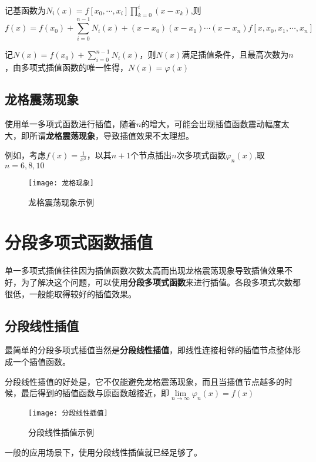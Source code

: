 \documentclass[withoutpreface]{cumcmthesis}
\begin{document}
记基函数为$N_i(x)=f[x_0,\cdots,x_{i}] \prod \limits_{k=0}^i(x-x_k)$,则
\begin{equation}
    f(x)=f(x_0)+\sum\limits_{i=0}^{n-1}N_i(x)+(x-x_0)(x-x_1)\cdots(x-x_{n})f[x,x_0,x_1,\cdots,x_{n}]
\end{equation}

记$N(x)=f(x_0)+\sum\limits_{i=0}^{n-1}N_i(x)$，则$N(x)$满足插值条件，且最高次数为$n$，由多项式插值函数的唯一性得，$N(x)=\varphi(x)$

\subsection{龙格震荡现象}

使用单一多项式函数进行插值，随着$n$的增大，可能会出现插值函数震动幅度太大，即所谓\textbf{龙格震荡现象}，导致插值效果不太理想。

例如，考虑$f(x)=\frac{1}{x^2}$，以其$n+1$个节点插出$n$次多项式函数$\varphi_n(x)$,取$n=6,8,10$

\begin{figure}[H]
    \centering
    \texttt{[image: 龙格现象]}
    \caption{龙格震荡现象示例}
\end{figure}

\section{分段多项式函数插值}

单一多项式插值往往因为插值函数次数太高而出现龙格震荡现象导致插值效果不好，为了解决这个问题，可以使用\textbf{分段多项式函数}来进行插值。各段多项式次数都很低，一般能取得较好的插值效果。

\subsection{分段线性插值}

最简单的分段多项式插值当然是\textbf{分段线性插值}，即线性连接相邻的插值节点整体形成一个插值函数。

分段线性插值的好处是，它不仅能避免龙格震荡现象，而且当插值节点越多的时候，最后得到的插值函数与原函数越接近，即$\lim \limits_{n \to \infty} \varphi_n(x) = f(x)$

\begin{figure}[H]
    \centering
    \texttt{[image: 分段线性插值]}
    \caption{分段线性插值示例}
\end{figure}

一般的应用场景下，使用分段线性插值就已经足够了。
\end{document}
